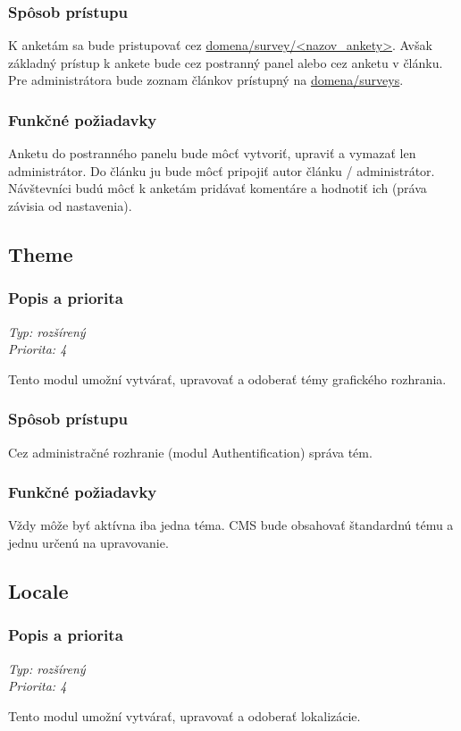 \documentclass[a4paper,titlepage,11pt]{article}
\begin{document}
\subsubsection{Spôsob prístupu}
K anketám sa bude pristupovať cez \url{domena/survey/<nazov_ankety>}.
Avšak základný prístup k ankete bude cez postranný panel alebo cez anketu v článku. 
Pre administrátora bude zoznam článkov prístupný na \url{domena/surveys}. 
\subsubsection{Funkčné požiadavky}
Anketu do postranného panelu bude môcť vytvoriť, upraviť a vymazať len administrátor. Do článku ju bude môcť pripojiť autor článku / administrátor. 
Návštevníci budú môcť k anketám pridávať komentáre a hodnotiť ich (práva závisia od nastavenia).

\subsection{Theme}
\subsubsection{Popis a priorita}
\begin{flushleft}
 \emph{Typ: rozšírený}\\
 \emph{Priorita: 4}\\
\end{flushleft}
Tento modul umožní vytvárať, upravovať a odoberať témy grafického rozhrania.
\subsubsection{Spôsob prístupu}
Cez administračné rozhranie (modul Authentification) správa tém.
\subsubsection{Funkčné požiadavky}
Vždy môže byť aktívna iba jedna téma. CMS bude obsahovať štandardnú tému a jednu určenú na upravovanie.

\subsection{Locale}
\subsubsection{Popis a priorita}
\begin{flushleft}
 \emph{Typ: rozšírený}\\
 \emph{Priorita: 4}\\
\end{flushleft}
Tento modul umožní vytvárať, upravovať a odoberať lokalizácie.
\end{document}
